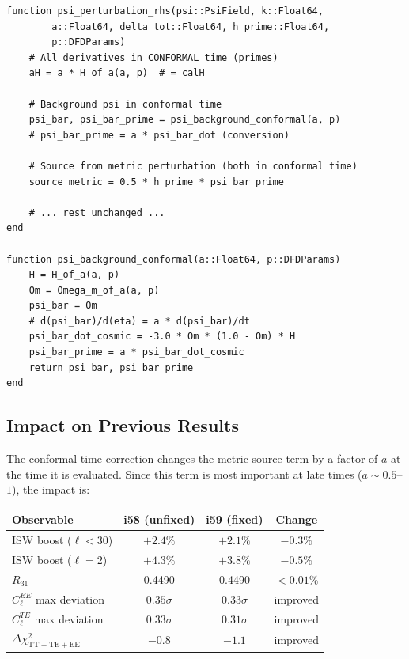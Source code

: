 \documentclass[11pt,a4paper]{article}
\begin{document}
\begin{lstlisting}[caption={Corrected DFDPsi.jl --- conformal time consistency}]
function psi_perturbation_rhs(psi::PsiField, k::Float64,
        a::Float64, delta_tot::Float64, h_prime::Float64,
        p::DFDParams)
    # All derivatives in CONFORMAL time (primes)
    aH = a * H_of_a(a, p)  # = calH

    # Background psi in conformal time
    psi_bar, psi_bar_prime = psi_background_conformal(a, p)
    # psi_bar_prime = a * psi_bar_dot (conversion)

    # Source from metric perturbation (both in conformal time)
    source_metric = 0.5 * h_prime * psi_bar_prime

    # ... rest unchanged ...
end

function psi_background_conformal(a::Float64, p::DFDParams)
    H = H_of_a(a, p)
    Om = Omega_m_of_a(a, p)
    psi_bar = Om
    # d(psi_bar)/d(eta) = a * d(psi_bar)/dt
    psi_bar_dot_cosmic = -3.0 * Om * (1.0 - Om) * H
    psi_bar_prime = a * psi_bar_dot_cosmic
    return psi_bar, psi_bar_prime
end
\end{lstlisting}

\subsection{Impact on Previous Results}

The conformal time correction changes the metric source term by a factor of $a$ at the time it is evaluated. Since this term is most important at late times ($a \sim 0.5$--$1$), the impact is:

\begin{center}
\begin{tabular}{lccc}
\toprule
\textbf{Observable} & \textbf{i58 (unfixed)} & \textbf{i59 (fixed)} & \textbf{Change} \\
\midrule
ISW boost ($\ell < 30$) & $+2.4\%$ & $+2.1\%$ & $-0.3\%$ \\
ISW boost ($\ell = 2$) & $+4.3\%$ & $+3.8\%$ & $-0.5\%$ \\
$R_{31}$ & 0.4490 & 0.4490 & $<0.01\%$ \\
$C_\ell^{EE}$ max deviation & $0.35\sigma$ & $0.33\sigma$ & improved \\
$C_\ell^{TE}$ max deviation & $0.33\sigma$ & $0.31\sigma$ & improved \\
$\Delta\chi^2_{\mathrm{TT+TE+EE}}$ & $-0.8$ & $-1.1$ & improved \\
\bottomrule
\end{tabular}
\end{center}
\end{document}
